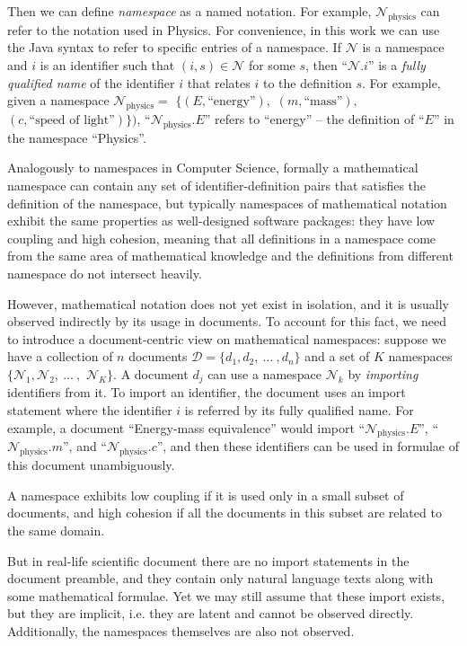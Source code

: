 Then we can define \emph{namespace} as a named notation. For example,
$\mathcal N_\text{physics}$ can refer to the notation used in Physics.
For convenience, in this work we can use the Java syntax to refer to
specific entries of a namespace. If $\mathcal N$ is a namespace and $i$
is an identifier such that $(i, s) \in \mathcal N$ for some $s$, then
``$\mathcal N$.$i$'' is a \emph{fully qualified name} of the identifier $i$ that
relates $i$ to the definition $s$. For example,
given a namespace $\mathcal N_\text{physics} =$ $\{ (E, \text{``energy''}),$
$(m, \text{``mass''}),$ $(c, \text{``speed of light''}) \} \big)$,
``$\mathcal N_\text{physics}$.$E$'' refers to ``energy'' -- the definition of ``$E$'' in the
namespace ``Physics''.


Analogously to namespaces in Computer Science, formally a mathematical namespace
can contain any set of identifier-definition pairs that satisfies the definition of
the namespace, but typically namespaces of mathematical notation
exhibit the same properties as well-designed software packages: they
have low coupling and high cohesion, meaning that all definitions
in a namespace
come from the same area of mathematical knowledge and the definitions
from different namespace do not intersect heavily.

However, mathematical notation does not yet exist in isolation, and it is 
usually observed indirectly by its usage in documents. To account for this fact,
we need to introduce a document-centric view on mathematical
namespaces: suppose we have a collection of $n$ documents
$\mathcal D = \{ d_1, d_2, \ ... \ , d_n \}$ and a set of $K$ namespaces
$\{\mathcal N_1, \mathcal N_2, \ ... \ ,$ $\mathcal N_K \}$.
A document $d_j$ can use a namespace $\mathcal N_k$ by \emph{importing}
identifiers from it. To import an identifier, the document uses an import statement
where the identifier $i$ is referred by its fully qualified name.
For example, a document ``Energy-mass equivalence'' would import
``$\mathcal N_\text{physics}$.$E$'', ``$\mathcal N_\text{physics}$.$m$'',
and ``$\mathcal N_\text{physics}$.$c$'', and then these identifiers can be used in
formulae of this document unambiguously.

A namespace exhibits low coupling if it is used only in a small
subset of documents, and high cohesion if all the documents in this subset
are related to the same domain.

But in real-life scientific document there are no import statements
in the document preamble, and they contain only natural language
texts along with some mathematical formulae. Yet we may still assume
that these import exists, but they are implicit, i.e. they are latent
and cannot be observed directly. Additionally, the namespaces themselves are
also not observed.

